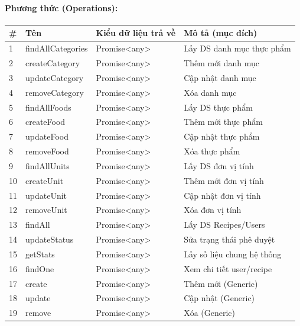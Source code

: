 \documentclass[12pt,a4paper]{article}
\begin{document}
\paragraph{Phương thức (Operations):}
\begin{longtable}{|p{0.6cm}|p{5.0cm}|p{2.8cm}|p{5.4cm}|}
\hline
\textbf{\#} & \textbf{Tên} & \textbf{Kiểu dữ liệu trả về} & \textbf{Mô tả (mục đích)} \\ \hline
\endhead
1 & findAllCategories & Promise\textless{}any\textgreater{} & Lấy DS danh mục thực phẩm \\ \hline
2 & createCategory & Promise\textless{}any\textgreater{} & Thêm mới danh mục \\ \hline
3 & updateCategory & Promise\textless{}any\textgreater{} & Cập nhật danh mục \\ \hline
4 & removeCategory & Promise\textless{}any\textgreater{} & Xóa danh mục \\ \hline
5 & findAllFoods & Promise\textless{}any\textgreater{} & Lấy DS thực phẩm \\ \hline
6 & createFood & Promise\textless{}any\textgreater{} & Thêm mới thực phẩm \\ \hline
7 & updateFood & Promise\textless{}any\textgreater{} & Cập nhật thực phẩm \\ \hline
8 & removeFood & Promise\textless{}any\textgreater{} & Xóa thực phẩm \\ \hline
9 & findAllUnits & Promise\textless{}any\textgreater{} & Lấy DS đơn vị tính \\ \hline
10 & createUnit & Promise\textless{}any\textgreater{} & Thêm mới đơn vị tính \\ \hline
11 & updateUnit & Promise\textless{}any\textgreater{} & Cập nhật đơn vị tính \\ \hline
12 & removeUnit & Promise\textless{}any\textgreater{} & Xóa đơn vị tính \\ \hline
13 & findAll & Promise\textless{}any\textgreater{} & Lấy DS Recipes/Users \\ \hline
14 & updateStatus & Promise\textless{}any\textgreater{} & Sửa trạng thái phê duyệt \\ \hline
15 & getStats & Promise\textless{}any\textgreater{} & Lấy số liệu chung hệ thống \\ \hline
16 & findOne & Promise\textless{}any\textgreater{} & Xem chi tiết user/recipe \\ \hline
17 & create & Promise\textless{}any\textgreater{} & Thêm mới (Generic) \\ \hline
18 & update & Promise\textless{}any\textgreater{} & Cập nhật (Generic) \\ \hline
19 & remove & Promise\textless{}any\textgreater{} & Xóa (Generic) \\ \hline
\end{longtable}
\end{document}
